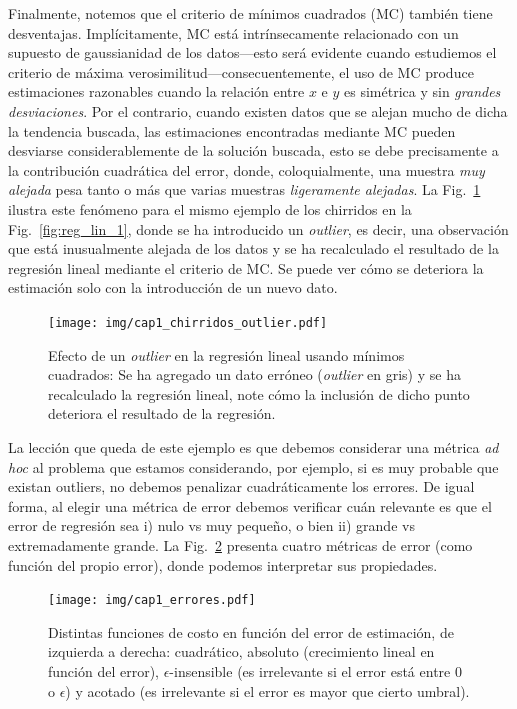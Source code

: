 Finalmente, notemos que el criterio de  mínimos cuadrados (MC) también tiene desventajas. Implícitamente, MC está intrínsecamente relacionado con un supuesto de gaussianidad de los datos---esto será evidente cuando estudiemos el criterio de máxima verosimilitud---consecuentemente, el uso de MC produce estimaciones razonables cuando la relación entre $x$  e $y$ es simétrica y sin \emph{grandes desviaciones}. Por el contrario, cuando existen datos  que se alejan mucho de dicha la tendencia buscada, las estimaciones encontradas mediante MC pueden desviarse considerablemente de la solución buscada, esto se debe precisamente a la contribución cuadrática del error, donde, coloquialmente, una muestra \emph{muy alejada} pesa tanto o más que varias muestras \emph{ligeramente alejadas}. La Fig.~\ref{fig:reg_lin_2} ilustra este fenómeno para el mismo ejemplo de los chirridos en la Fig.~\ref{fig:reg_lin_1}, donde se ha introducido un \emph{outlier}, es decir, una observación que está inusualmente alejada de los datos y se ha recalculado el resultado de la regresión lineal mediante el criterio de MC. Se puede ver cómo se deteriora la estimación solo con la introducción de un nuevo dato. 



\begin{figure}[H]
	\centering
	\texttt{[image: img/cap1\_chirridos\_outlier.pdf]}\\
	\caption{Efecto de un \emph{outlier} en la regresión lineal usando mínimos cuadrados: Se ha agregado un dato erróneo (\emph{outlier} en gris) y se ha recalculado la regresión lineal, note cómo la inclusión de dicho punto deteriora el resultado de la regresión.}
	\label{fig:reg_lin_2}
\end{figure}

La lección que queda de este ejemplo es que debemos considerar una métrica \emph{ad hoc} al problema que estamos considerando, por ejemplo, si es muy probable que existan outliers, no debemos penalizar cuadráticamente los errores. De igual forma, al elegir una métrica de error debemos verificar cuán relevante es que el error de regresión sea i) nulo vs muy pequeño, o bien ii) grande vs extremadamente grande. La Fig.~\ref{fig:reg_lin_err} presenta cuatro métricas de error (como función del propio error), donde podemos interpretar sus propiedades. 

\begin{figure}[H]
	\centering
	\texttt{[image: img/cap1\_errores.pdf]}\\
	\caption{Distintas funciones de costo en función del error de estimación, de izquierda a derecha: cuadrático, absoluto (crecimiento lineal en función del error), $\epsilon$-insensible (es irrelevante si el error está entre 0 o  $\epsilon$) y acotado (es irrelevante si el error es mayor que cierto umbral).}
	\label{fig:reg_lin_err}  
\end{figure}


